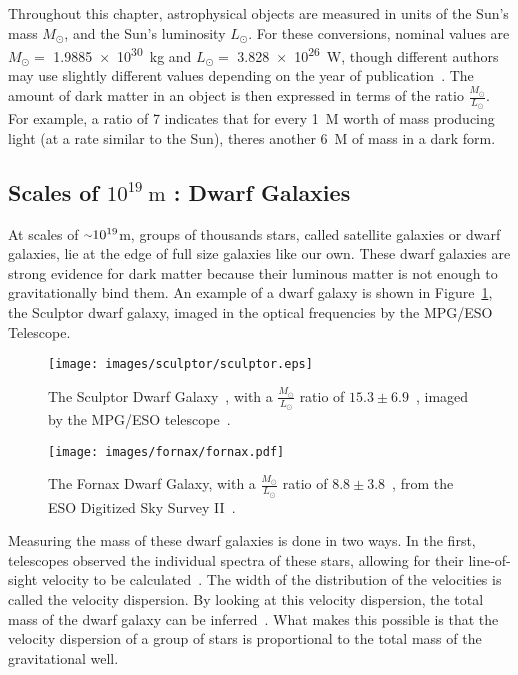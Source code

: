 Throughout this chapter, astrophysical objects are measured in units of the Sun's mass $M_\odot$, and the Sun's luminosity $L_\odot$.
For these conversions, nominal values are $M_\odot =$ \SI{1.9885e30}{kg} and $L_\odot =$ \SI{3.828e26}{W}, though different authors may use slightly different values depending on the year of publication~\cite{iau_solarconstants}.
The amount of dark matter in an object is then expressed in terms of the ratio $\frac{M_\odot}{L_\odot}$.
For example, a ratio of \SI{7}{} indicates that for every \SI{1}{M_\odot} worth of mass producing light (at a rate similar to the Sun), theres another \SI{6}{M_\odot} of mass in a dark form.
  
\subsection{Scales of $10^{19}\:\text{m}$ : Dwarf Galaxies}\label{dm_dwarfscale}
At scales of $\nicetilde 10^{19}$m, groups of thousands stars, called satellite galaxies or dwarf galaxies, lie at the edge of full size galaxies like our own.
These dwarf galaxies are strong evidence for dark matter because their luminous matter is not enough to gravitationally bind them.
An example of a dwarf galaxy is shown in Figure~\ref{fig:sculptor}, the Sculptor dwarf galaxy, imaged in the optical frequencies by the MPG/ESO Telescope.

\begin{figure}[h]
  \centering
  \texttt{[image: images/sculptor/sculptor.eps]}
  \caption[Sculptor Dwarf Galaxy]{
    The Sculptor Dwarf Galaxy~\cite{sculptor_image}, with a $\frac{M_\odot}{L_\odot}$ ratio of $15.3\pm6.9$~\cite{sculptor_ml}, imaged by the MPG/ESO telescope~\cite{sculptor_paper}.
  }
  \label{fig:sculptor}
\end{figure}

\begin{figure}[h]
  \centering
  \texttt{[image: images/fornax/fornax.pdf]}
  \caption[Fornax Dwarf Galaxy]{
    The Fornax Dwarf Galaxy, with a $\frac{M_\odot}{L_\odot}$ ratio of $8.8\pm3.8$~\cite{sculptor_ml}, from the ESO Digitized Sky Survey II~\cite{fornax_image}.
  }
  \label{fig:fornax}
\end{figure}

Measuring the mass of these dwarf galaxies is done in two ways.
In the first, telescopes observed the individual spectra of these stars, allowing for their line-of-sight velocity to be calculated~\cite{dwarf_gal_red_giant}.
The width of the distribution of the velocities is called the velocity dispersion.
By looking at this velocity dispersion, the total mass of the dwarf galaxy can be inferred~\cite{dwarf_gal_vel_dispersion, dwarf_gal_vel_dispersion2}.
What makes this possible is that the velocity dispersion of a group of stars is proportional to the total mass of the gravitational well.

